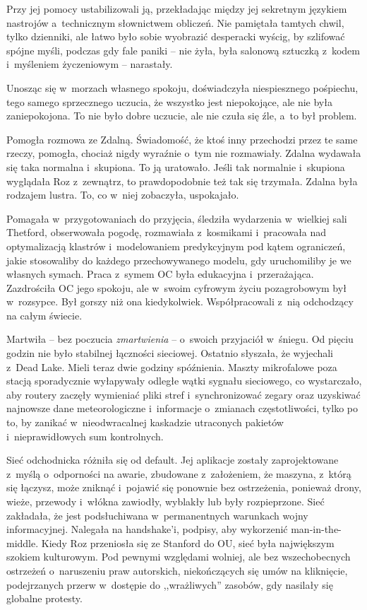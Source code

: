 \documentclass[oneside,polish,11pt,sfheadings]{mwbk}
\begin{document}
Przy jej pomocy ustabilizowali ją, przekładając między jej sekretnym
językiem nastrojów a~technicznym słownictwem obliczeń. Nie pamiętała
tamtych chwil, tylko dzienniki, ale łatwo było sobie wyobrazić
desperacki wyścig, by szlifować spójne myśli, podczas gdy fale paniki -- nie żyła, była salonową sztuczką z~kodem i~myśleniem życzeniowym -- narastały.

Unosząc się w~morzach własnego spokoju, doświadczyła niespiesznego
pośpiechu, tego samego sprzecznego uczucia, że wszystko jest
niepokojące, ale nie była zaniepokojona. To nie było dobre uczucie, ale
nie czuła się źle, a~to był problem.

Pomogła rozmowa ze Zdalną. Świadomość, że ktoś inny przechodzi przez te
same rzeczy, pomogła, chociaż nigdy wyraźnie o~tym nie rozmawiały.
Zdalna wydawała się taka normalna i~skupiona. To ją uratowało. Jeśli tak
normalnie i~skupiona wyglądała Roz z~zewnątrz, to prawdopodobnie też tak
się trzymała. Zdalna była rodzajem lustra. To, co w~niej zobaczyła,
uspokajało.

Pomagała w~przygotowaniach do przyjęcia, śledziła wydarzenia w~wielkiej
sali Thetford, obserwowała pogodę, rozmawiała z~kosmikami i~pracowała
nad optymalizacją klastrów i~modelowaniem predykcyjnym pod kątem
ograniczeń, jakie stosowaliby do każdego przechowywanego modelu, gdy
uruchomiliby je we własnych symach. Praca z~symem OC była edukacyjna i~przerażająca. Zazdrościła OC jego spokoju, ale w~swoim cyfrowym życiu
pozagrobowym był w~rozsypce. Był gorszy niż ona kiedykolwiek.
Współpracowali z~nią odchodzący na całym świecie.

Martwiła -- bez poczucia \textit{zmartwienia} -- o~swoich przyjaciół w~śniegu. Od pięciu godzin nie było stabilnej łączności sieciowej.
Ostatnio słyszała, że wyjechali z~Dead Lake. Mieli teraz dwie godziny
spóźnienia. Maszty mikrofalowe poza stacją sporadycznie wyłapywały
odległe wątki sygnału sieciowego, co wystarczało, aby routery zaczęły
wymieniać pliki stref i~synchronizować zegary oraz uzyskiwać najnowsze
dane meteorologiczne i~informacje o~zmianach częstotliwości, tylko po
to, by zanikać w~nieodwracalnej kaskadzie utraconych pakietów i~nieprawidłowych sum kontrolnych.

Sieć odchodnicka różniła się od default. Jej aplikacje zostały
zaprojektowane z~myślą o~odporności na awarie, zbudowane z~założeniem,
że maszyna, z~którą się łączysz, może zniknąć i~pojawić się ponownie bez
ostrzeżenia, ponieważ drony, wieże, przewody i~włókna zawiodły, wyblakły
lub były rozpieprzone. Sieć zakładała, że jest podsłuchiwana w~permanentnych warunkach wojny informacyjnej. Nalegała na handshake'i,
podpisy, aby wykorzenić man-in-the-middle. Kiedy Roz przeniosła się ze
Stanford do OU, sieć była największym szokiem kulturowym. Pod pewnymi
względami wolniej, ale bez wszechobecnych ostrzeżeń o~naruszeniu praw
autorskich, niekończących się umów na kliknięcie, podejrzanych przerw w~dostępie do ,,wrażliwych'' zasobów, gdy nasilały się globalne protesty.
\end{document}
